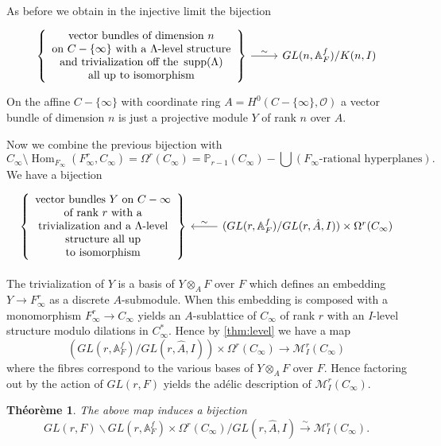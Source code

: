 \documentclass[12pt,a4paper]{article}
\theoremstyle{plain}
\newtheorem{theorem}{Th\'eor\`eme}[section]
\theoremstyle{definition}
\theoremstyle{remark}
\DeclareMathOperator{\Hom}{Hom}
\newcommand{\bP}{\mathbb{P}}
\newcommand{\bA}{\mathbb{A}}
\newcommand{\cO}{\mathcal{O}}
\newcommand{\cM}{\mathcal{M}}
\providecommand{\cM}{\mathcal{M}}
\providecommand{\cO}{\mathcal{O}}
\providecommand{\Hom}{\operatorname{Hom}}
\providecommand{\supp}{\operatorname{supp}}
\begin{document}
As before we obtain in the injective limit the bijection
\[
\begin{tikzcd}
\left\{\begin{array}{c}
\text{vector bundles of dimension } n \\
\text{on } C - \{\infty\} \text{ with a } \Lambda\text{-level structure} \\
\text{and trivialization off the } \supp(\Lambda) \\
\text{all up to isomorphism}
\end{array}\right\} \arrow[r, "\sim"] & GL(n, \bA_F^f) / K(n, I)
\end{tikzcd}
\]
On the affine $C - \{\infty\}$ with coordinate ring $A = H^0(C - \{\infty\}, \cO)$ a vector bundle of dimension $n$ is just a projective module $Y$ of rank $n$ over $A$.

Now we combine the previous bijection with
\[
C_\infty \setminus \Hom_{F_\infty}(F_\infty^r, C_\infty) = \Omega^r(C_\infty) = \bP_{r-1}(C_\infty) - \bigcup (F_\infty\text{-rational hyperplanes}).
\]
We have a bijection
\[
\begin{tikzcd}
\left\{\begin{array}{c}
\text{vector bundles } Y \text{ on } C-\infty \\
\text{of rank } r \text{ with a} \\
\text{trivialization and a } \Lambda\text{-level} \\
\text{structure all up} \\
\text{to isomorphism}
\end{array}\right\} & (GL(r, \bA_F^f)/GL(r, \hat{A}, I)) \times \Omega^r(C_\infty) \arrow[l, "\sim"']
\end{tikzcd}
\]

The trivialization of $Y$ is a basis of $Y \otimes_A F$ over $F$ which defines an embedding $Y \to F_\infty^r$ as a discrete $A$-submodule. When this embedding is composed with a monomorphism $F_\infty^r \to C_\infty$ yields an $A$-sublattice of $C_\infty$ of rank $r$ with an $I$-level structure modulo dilations in $C_\infty^*$. Hence by \eqref{thm:level} we have a map
\[
(GL(r, \bA_F^f)/GL(r, \hat{A}, I)) \times \Omega^r(C_\infty) \to \cM_I^r(C_\infty)
\]
where the fibres correspond to the various bases of $Y \otimes_A F$ over $F$. Hence factoring out by the action of $GL(r, F)$ yields the ad\'elic description of $\cM_I^r(C_\infty)$.

\begin{theorem}
\label{thm:adelic}
The above map induces a bijection
\[
GL(r, F) \backslash GL(r, \bA_F^f) \times \Omega^r(C_\infty) / GL(r, \hat{A}, I) \xrightarrow{\sim} \cM_I^r(C_\infty).
\]
\end{theorem}
\end{document}
